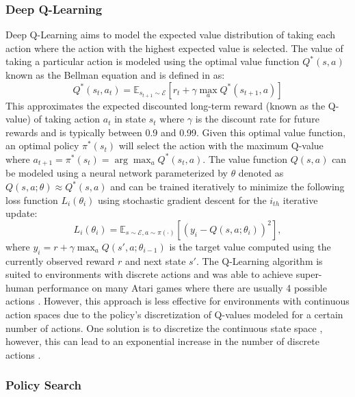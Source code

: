 \subsubsection{Deep Q-Learning}

Deep Q-Learning aims to model the expected value distribution of taking each action where the action with the highest expected value is selected. The value of taking a particular action is modeled using the optimal value function $Q^*(s,a)$ known as the Bellman equation and is defined in \cite{2.1.0} as:
\begin{dmath}
	Q^*(s_t,a_t) = \mathbb{E}_{s_{t+1} \sim \mathcal{E}} \left[ r_t + \gamma \max_a Q^*(s_{t+1},a) \right]
\end{dmath}
This approximates the expected discounted long-term reward (known as the Q-value) of taking action $a_t$ in state $s_t$ where $\gamma$ is the discount rate for future rewards and is typically between 0.9 and 0.99. Given this optimal value function, an optimal policy $\pi^*(s_t)$ will select the action with the maximum Q-value where $a_{t+1} = \pi^*(s_t) = \arg \max_a Q^*(s_t,a)$. The value function $Q(s,a)$ can be modeled using a neural network parameterized by $\theta$ denoted as $Q(s,a;\theta) \approx Q^*(s,a)$ and can be trained iteratively to minimize the following loss function $L_i(\theta_i)$ using stochastic gradient descent for the $i_{th}$ iterative update:
\begin{dmath}
	L_i(\theta_i) = \mathbb{E}_{s \sim \mathcal{E}, a \sim \pi(\cdot)} \left[ (y_i - Q(s,a;\theta_i))^2 \right], 
\end{dmath}
where $y_i = r + \gamma \max_a Q(s',a;\theta_{i-1})$ is the target value computed using the currently observed reward $r$ and next state $s'$. The Q-Learning algorithm is suited to environments with discrete actions and was able to achieve super-human performance on many Atari games where there are usually 4 possible actions \cite{2.1.1}. However, this approach is less effective for environments with continuous action spaces due to the policy's discretization of Q-values modeled for a certain number of actions. One solution is to discretize the continuous state space \cite{2.1.3}, however, this can lead to an exponential increase in the number of discrete actions \cite{2.2}.

\subsubsection{Policy Search}

